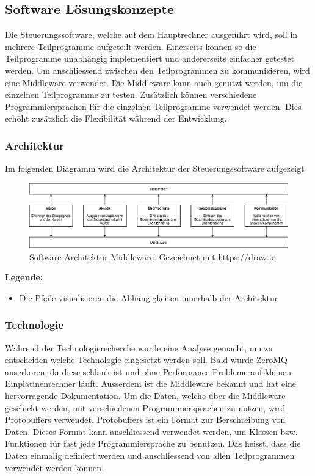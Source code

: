 \documentclass[../../main.tex]{subfiles}
\begin{document}
\subsection{Software Lösungskonzepte}
Die Steuerungssoftware, welche auf dem Hauptrechner ausgeführt wird, soll in mehrere Teilprogramme aufgeteilt werden.
Einerseits können so die Teilprogramme unabhängig implementiert und andererseits einfacher getestet werden.
Um anschliessend zwischen den Teilprogrammen zu kommunizieren, wird eine Middleware verwendet. Die Middleware kann auch genutzt werden,
um die einzelnen Teilprogramme zu testen. Zusätzlich können verschiedene Programmiersprachen für die einzelnen Teilprogramme verwendet werden.
Dies erhöht zusätzlich die Flexibilität während der Entwicklung.

\subsubsection{Architektur}
Im folgenden Diagramm wird die Architektur der Steuerungssoftware aufgezeigt
\begin{figure}[H] %
    \centering
    \includegraphics[width=1.0\textwidth]{drawings/ArchitekturDiagramm/SW_Architektur_Middleware.png}
    \caption {Software Architektur Middleware. Gezeichnet mit https://draw.io}
\end{figure}

\textbf{Legende:}
\begin{itemize}
    \item Die Pfeile visualisieren die Abhängigkeiten innerhalb der Architektur
\end{itemize}

\subsubsection{Technologie}
Während der Technologierecherche wurde eine Analyse gemacht, um zu entscheiden welche Technologie eingesetzt werden soll. Bald wurde ZeroMQ
auserkoren, da diese schlank ist und ohne Performance Probleme auf kleinen Einplatinenrechner läuft. Ausserdem ist die Middleware bekannt
und hat eine hervorragende Dokumentation. Um die Daten, welche über die Middleware geschickt werden, mit verschiedenen Programmiersprachen zu
nutzen, wird Protobuffers verwendet. Protobuffers ist ein Format zur Berschreibung von Daten. Dieses Format kann anschliessend verwendet werden, um
Klassen bzw. Funktionen für fast jede Programmiersprache zu benutzen. Das heisst, dass die Daten einmalig definiert werden und anschliessend von
allen Teilprogrammen verwendet werden können.
\end{document}
